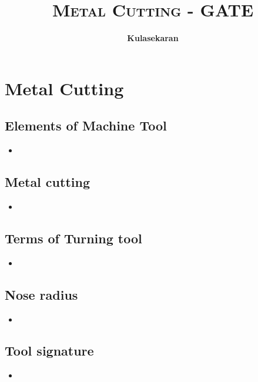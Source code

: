 \documentclass[8pt]{report}
\title{\Huge{\textsc{Metal Cutting - GATE}}}
\author{\huge{\textbf{Kulasekaran}}}
\begin{document}
\maketitle
\tableofcontents
\chapter{Metal Cutting}
\section{Elements of Machine Tool}
	\begin{itemize}
		\item
	\end{itemize}\hrulefill
\section{Metal cutting}
	\begin{itemize}
		\item
	\end{itemize}\hrulefill
\section{Terms of Turning tool}
	\begin{itemize}
		\item
	\end{itemize}\hrulefill
\section{Nose radius}
	\begin{itemize}
		\item
	\end{itemize}\hrulefill
\section{Tool signature}
	\begin{itemize}
		\item
	\end{itemize}\hrulefill
\end{document}
